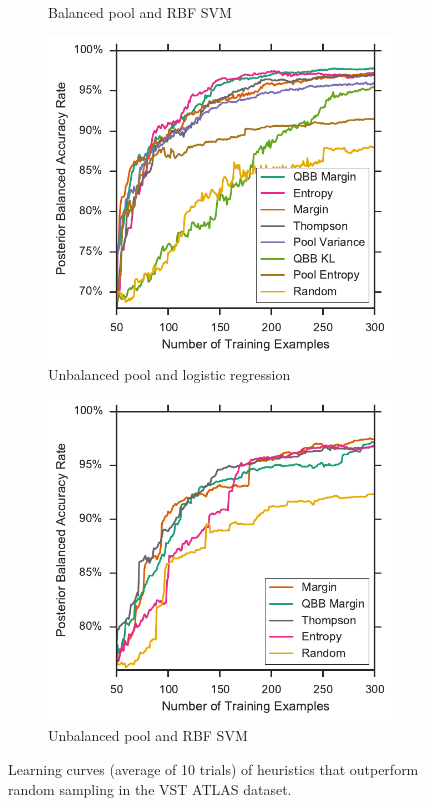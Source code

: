 \begin{figure}[p]
\begin{subfigure}{.5\textwidth}
		\caption{Balanced pool and RBF SVM}
		\label{fig:vstatlas_br_ind_upper}
	\end{subfigure}
	\begin{subfigure}{.5\textwidth}
		\centering
		\includegraphics[width=\textwidth]{figures/5_active/vstatlas_ul_ind_upper}
		\caption{Unbalanced pool and logistic regression}
		\label{fig:vstatlas_ul_ind_upper}
	\end{subfigure}%
	\begin{subfigure}{.5\textwidth}
		\centering
		\includegraphics[width=\linewidth]{figures/5_active/vstatlas_ur_ind_upper}
		\caption{Unbalanced pool and RBF SVM}
		\label{fig:vstatlas_ur_ind_upper}
	\end{subfigure}
	\caption[Learning curves of heuristics better than random (VST ATLAS)]{
		Learning curves (average of 10 trials) of heuristics that outperform random sampling in the VST ATLAS dataset.
	}
	\label{fig:vstatlas_ind_upper}
\end{figure}


